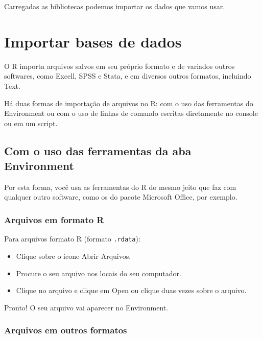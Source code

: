 \documentclass[
  brazil,
]{book}
\providecommand{\tightlist}{%
  \setlength{\itemsep}{0pt}\setlength{\parskip}{0pt}}
\begin{document}
Carregadas as bibliotecas podemos importar os dados que vamos usar.

\hypertarget{importar-bases-de-dados}{%
\chapter{Importar bases de dados}\label{importar-bases-de-dados}}

O R importa arquivos salvos em seu próprio formato e de variados outros softwares, como Excell, SPSS e Stata, e em diversos outros formatos, incluindo Text.

Há duas formas de importação de arquivos no R: com o uso das ferramentas do Environment ou com o uso de linhas de comando escritas diretamente no console ou em um script.

\hypertarget{com-o-uso-das-ferramentas-da-aba-environment}{%
\section{Com o uso das ferramentas da aba Environment}\label{com-o-uso-das-ferramentas-da-aba-environment}}

Por esta forma, você usa as ferramentas do R do mesmo jeito que faz com qualquer outro software, como os do pacote Microsoft Office, por exemplo.

\hypertarget{arquivos-em-formato-r}{%
\subsection{Arquivos em formato R}\label{arquivos-em-formato-r}}

Para arquivos formato R (formato \texttt{.rdata}):

\begin{itemize}
\tightlist
\item
  Clique sobre o icone Abrir Arquivos.
\item
  Procure o seu arquivo nos locais do seu computador.
\item
  Clique no arquivo e clique em Open ou clique duas vezes sobre o arquivo.
\end{itemize}

Pronto! O seu arquivo vai aparecer no Environment.

\hypertarget{arquivos-em-outros-formatos}{%
\subsection{Arquivos em outros formatos}\label{arquivos-em-outros-formatos}}
\end{document}
